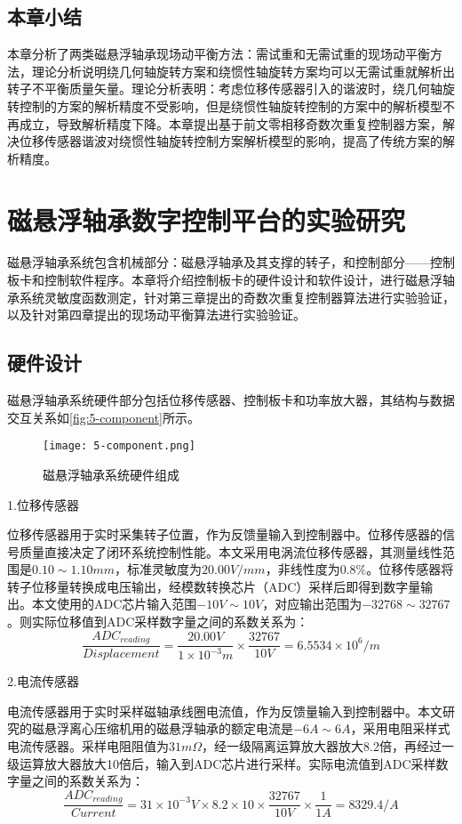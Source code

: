 \section{本章小结}
本章分析了两类磁悬浮轴承现场动平衡方法：需试重和无需试重的现场动平衡方法，理论分析说明绕几何轴旋转方案和绕惯性轴旋转方案均可以无需试重就解析出转子不平衡质量矢量。理论分析表明：考虑位移传感器引入的谐波时，绕几何轴旋转控制的方案的解析精度不受影响，但是绕惯性轴旋转控制的方案中的解析模型不再成立，导致解析精度下降。本章提出基于前文零相移奇数次重复控制器方案，解决位移传感器谐波对绕惯性轴旋转控制方案解析模型的影响，提高了传统方案的解析精度。


\chapter{磁悬浮轴承数字控制平台的实验研究}
磁悬浮轴承系统包含机械部分：磁悬浮轴承及其支撑的转子，和控制部分——控制板卡和控制软件程序。本章将介绍控制板卡的硬件设计和软件设计，进行磁悬浮轴承系统灵敏度函数测定，针对第三章提出的奇数次重复控制器算法进行实验验证，以及针对第四章提出的现场动平衡算法进行实验验证。

\section{硬件设计}
磁悬浮轴承系统硬件部分包括位移传感器、控制板卡和功率放大器，其结构与数据交互关系如\autoref{fig:5-component}所示。
\begin{figure}
	\texttt{[image: 5-component.png]}
	\caption{磁悬浮轴承系统硬件组成}
	\label{fig:5-component}
\end{figure}

1.位移传感器

位移传感器用于实时采集转子位置，作为反馈量输入到控制器中。位移传感器的信号质量直接决定了闭环系统控制性能。本文采用电涡流位移传感器，其测量线性范围是$0.10 \sim 1.10mm$，标准灵敏度为$20.00V/mm$，非线性度为$0.8\%$。位移传感器将转子位移量转换成电压输出，经模数转换芯片（ADC）采样后即得到数字量输出。本文使用的ADC芯片输入范围$-10V \sim 10V$，对应输出范围为$-32768 \sim 32767$。则实际位移值到ADC采样数字量之间的系数关系为：
\begin{equation}
\frac{ADC_{reading}}{Displacement} = \frac{20.00V}{1 \times 10^{-3}m} \times \frac{32767}{10V} = 6.5534 \times 10^6/m
\end{equation}

2.电流传感器

电流传感器用于实时采样磁轴承线圈电流值，作为反馈量输入到控制器中。本文研究的磁悬浮离心压缩机用的磁悬浮轴承的额定电流是$-6A\sim 6A$，采用电阻采样式电流传感器。采样电阻阻值为$31m\Omega$，经一级隔离运算放大器放大8.2倍，再经过一级运算放大器放大10倍后，输入到ADC芯片进行采样。实际电流值到ADC采样数字量之间的系数关系为：
\begin{equation}
\frac{ADC_{reading}}{Current} = 31 \times 10^{-3}V \times 8.2 \times 10 \times \frac{32767}{10V} \times \frac{1}{1A} = 8329.4/A
\end{equation}

